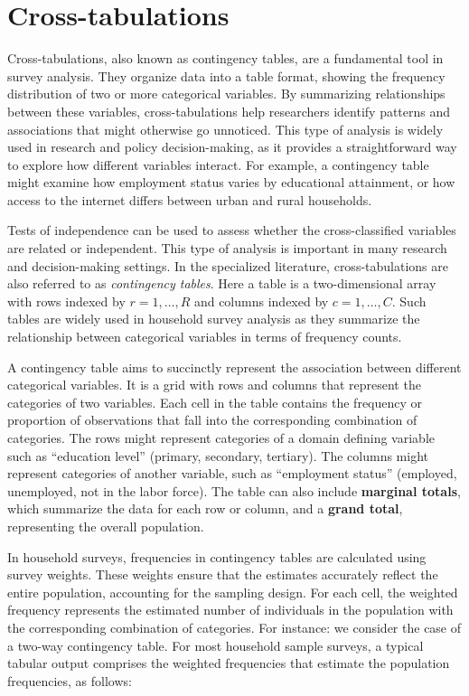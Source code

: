 \documentclass[
  12pt,
]{book}
\begin{document}
\hypertarget{cross-tabulations}{%
\section{Cross-tabulations}\label{cross-tabulations}}

Cross-tabulations, also known as contingency tables, are a fundamental tool in survey analysis. They organize data into a table format, showing the frequency distribution of two or more categorical variables. By summarizing relationships between these variables, cross-tabulations help researchers identify patterns and associations that might otherwise go unnoticed. This type of analysis is widely used in research and policy decision-making, as it provides a straightforward way to explore how different variables interact. For example, a contingency table might examine how employment status varies by educational attainment, or how access to the internet differs between urban and rural households.

Tests of independence can be used to assess whether the cross-classified variables are related or independent. This type of analysis is important in many research and decision-making settings. In the specialized literature, cross-tabulations are also referred to as \emph{contingency tables}. Here a table is a two-dimensional array with rows indexed by \(r=1, \ldots, R\) and columns indexed by \(c=1, \ldots, C\). Such tables are widely used in household survey analysis as they summarize the relationship between categorical variables in terms of frequency counts.

A contingency table aims to succinctly represent the association between different categorical variables. It is a grid with rows and columns that represent the categories of two variables. Each cell in the table contains the frequency or proportion of observations that fall into the corresponding combination of categories. The rows might represent categories of a domain defining variable such as ``education level'' (primary, secondary, tertiary). The columns might represent categories of another variable, such as ``employment status'' (employed, unemployed, not in the labor force). The table can also include \textbf{marginal totals}, which summarize the data for each row or column, and a \textbf{grand total}, representing the overall population.

In household surveys, frequencies in contingency tables are calculated using survey weights. These weights ensure that the estimates accurately reflect the entire population, accounting for the sampling design. For each cell, the weighted frequency represents the estimated number of individuals in the population with the corresponding combination of categories. For instance: we consider the case of a two-way contingency table. For most household sample surveys, a typical tabular output comprises the weighted frequencies that estimate the population frequencies, as follows:
\end{document}

